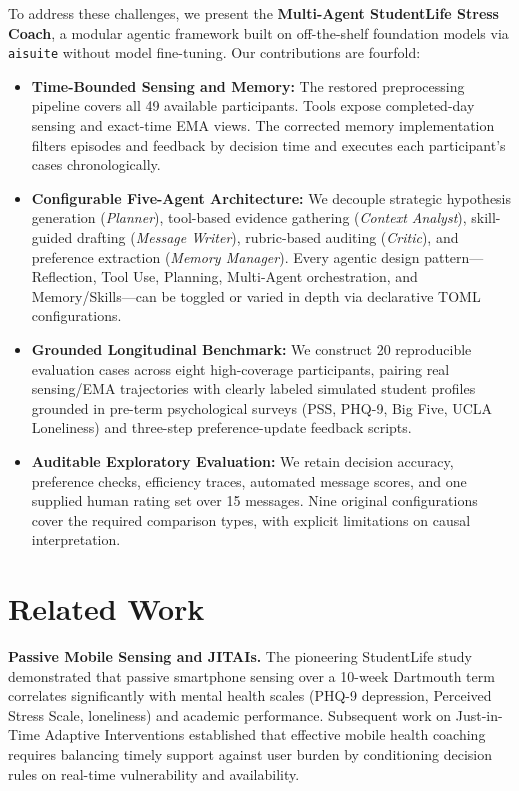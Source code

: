 \documentclass{article}
\begin{document}
To address these challenges, we present the \textbf{Multi-Agent StudentLife Stress Coach}, a modular agentic framework built on off-the-shelf foundation models via \texttt{aisuite} without model fine-tuning. Our contributions are fourfold:
\begin{itemize}
  \item \textbf{Time-Bounded Sensing and Memory:} The restored preprocessing pipeline covers all 49 available participants. Tools expose completed-day sensing and exact-time EMA views. The corrected memory implementation filters episodes and feedback by decision time and executes each participant's cases chronologically.
  \item \textbf{Configurable Five-Agent Architecture:} We decouple strategic hypothesis generation (\emph{Planner}), tool-based evidence gathering (\emph{Context Analyst}), skill-guided drafting (\emph{Message Writer}), rubric-based auditing (\emph{Critic}), and preference extraction (\emph{Memory Manager}). Every agentic design pattern---Reflection, Tool Use, Planning, Multi-Agent orchestration, and Memory/Skills---can be toggled or varied in depth via declarative TOML configurations.
  \item \textbf{Grounded Longitudinal Benchmark:} We construct 20 reproducible evaluation cases across eight high-coverage participants, pairing real sensing/EMA trajectories with clearly labeled simulated student profiles grounded in pre-term psychological surveys (PSS, PHQ-9, Big Five, UCLA Loneliness) and three-step preference-update feedback scripts.
  \item \textbf{Auditable Exploratory Evaluation:} We retain decision accuracy, preference checks, efficiency traces, automated message scores, and one supplied human rating set over 15 messages. Nine original configurations cover the required comparison types, with explicit limitations on causal interpretation.
\end{itemize}

\section{Related Work}
\label{sec:related}

\textbf{Passive Mobile Sensing and JITAIs.} The pioneering StudentLife study \cite{wang2014studentlife} demonstrated that passive smartphone sensing over a 10-week Dartmouth term correlates significantly with mental health scales (PHQ-9 depression, Perceived Stress Scale, loneliness) and academic performance. Subsequent work on Just-in-Time Adaptive Interventions \cite{nahum2018jitai} established that effective mobile health coaching requires balancing timely support against user burden by conditioning decision rules on real-time vulnerability and availability.
\end{document}
